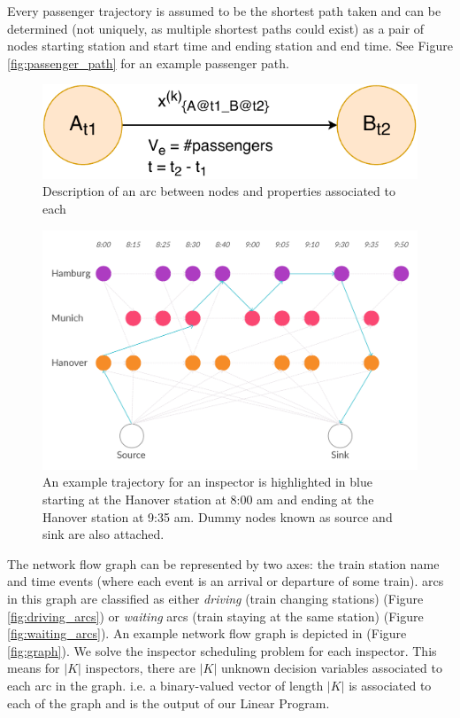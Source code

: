 \documentclass[11pt]{article}
\begin{document}
Every passenger trajectory is assumed to be the shortest path taken and can be determined (not uniquely, as multiple shortest paths could exist) as a pair of nodes starting station and start time and ending station and end time. See Figure \ref{fig:passenger_path} for an example passenger path.
\begin{figure}
    \centering
    \includegraphics[scale=0.7]{pics/nodes.pdf}
    \caption{Description of an arc between nodes and properties associated to each}
    \label{fig:arc}
\end{figure}

\begin{figure}
    \centering
    \includegraphics[scale=.15]{pics/Inspector_Path_Example.jpg}
    \caption{An example trajectory for an inspector is highlighted in blue starting at the Hanover station at 8:00 am and ending at the Hanover station at 9:35 am. Dummy nodes known as source and sink are also attached.}
    \label{fig:patrol_strategy}
\end{figure}

The network flow graph can be represented by two axes: the train station name and time events (where each event is an arrival or departure of some train). arcs in this graph are classified as either \textit{driving} (train changing stations) (Figure \ref{fig:driving_arcs}) or \textit{waiting} arcs (train staying at the same station) (Figure \ref{fig:waiting_arcs}). An example network flow graph is depicted in (Figure \ref{fig:graph}). We solve the inspector scheduling problem for each inspector. This means for $|K|$ inspectors, there are $|K|$ unknown decision variables associated to each arc in the graph. i.e. a binary-valued vector of length $|K|$ is associated to each of the graph and is the output of our Linear Program.
\end{document}
